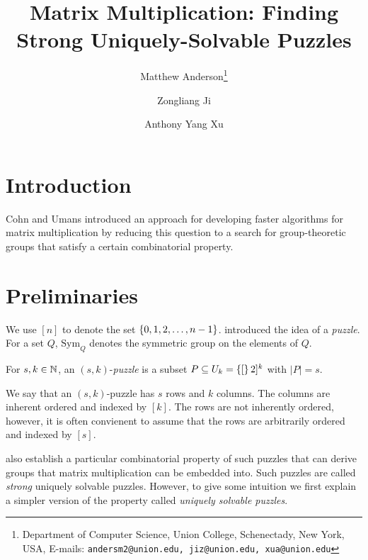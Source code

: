 \documentclass[11pt]{article}
\date{}
\title{Matrix Multiplication: Finding Strong Uniquely-Solvable Puzzles
{\IfFileExists{./sha.tex}{\\\small SHA: }{}}}
\author{
Matthew Anderson\thanks{Department of Computer Science, Union College, Schenectady, New York, USA, E-mails: \texttt{andersm2@union.edu, jiz@union.edu, xua@union.edu}}%
\and%
Zongliang Ji\samethanks[1]
\and%
Anthony Yang Xu\samethanks[1]
}
\newcommand\sse{\subseteq}
\newcommand\Sym[1]{\ensuremath{\mathrm{Sym}_{#1}}}
\begin{document}
\maketitle

\begin{abstract}

\end{abstract}

\thispagestyle{empty}
\newpage
{}


\section{Introduction}
\label{sec:intro}

Cohn and Umans \cite{cu03} introduced an approach for developing
faster algorithms for matrix multiplication by reducing this question
to a search for group-theoretic groups that satisfy a certain
combinatorial property.

\section{Preliminaries}
\label{sec:prelim}

We use $[n]$ to denote the set $\left\{ 0,1,2,\ldots, n-1 \right\}$.
\cite{cksu05} introduced the idea of a \emph{puzzle}.  For a set $Q$,
$\Sym{Q}$ denotes the symmetric group on the elements of $Q$.

\begin{definition}[Puzzle]
  For $s, k \in \mathbb{N}$, an $(s,k)$-\emph{puzzle} is a
  subset $P \sse U_k = \set[2]^k$ with $|P| = s$.
\end{definition}

We say that an $(s,k)$-puzzle has $s$ rows and $k$ columns.  The
columns are inherent ordered and indexed by $[k]$.  The rows are not
inherently ordered, however, it is often convienent to assume that the
rows are arbitrarily ordered and indexed by $[s]$.

\cite{cksu05} also establish a particular combinatorial property of
such puzzles that can derive groups that matrix multiplication can be
embedded into.  Such puzzles are called \emph{strong} uniquely
solvable puzzles.  However, to give some intuition we first explain a
simpler version of the property called \emph{uniquely solvable
  puzzles}.
\end{document}
